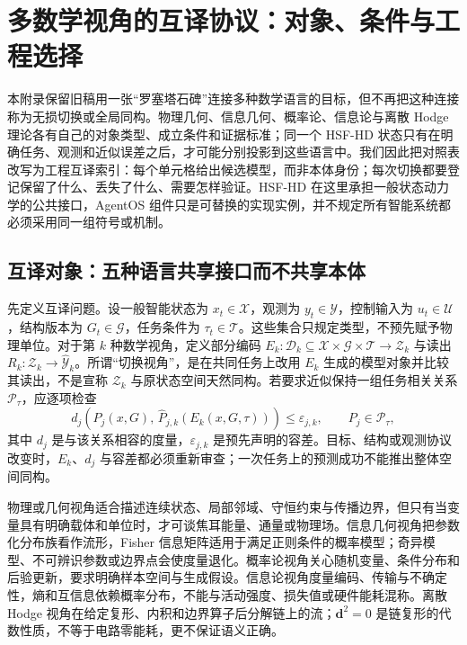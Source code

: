 \chapter{多数学视角的互译协议：对象、条件与工程选择}
\label{sec:section_7739}

本附录保留旧稿用一张“罗塞塔石碑”连接多种数学语言的目标，但不再把这种连接称为无损切换或全局同构。物理几何、信息几何、概率论、信息论与离散 Hodge 理论各有自己的对象类型、成立条件和证据标准；同一个 HSF-HD 状态只有在明确任务、观测和近似误差之后，才可能分别投影到这些语言中。我们因此把对照表改写为工程互译索引：每个单元格给出候选模型，而非本体身份；每次切换都要登记保留了什么、丢失了什么、需要怎样验证。HSF-HD 在这里承担一般状态动力学的公共接口，AgentOS 组件只是可替换的实现实例，并不规定所有智能系统都必须采用同一组符号或机制。

\section{互译对象：五种语言共享接口而不共享本体}

先定义互译问题。设一般智能状态为 $x_t\in\mathcal X$，观测为 $y_t\in\mathcal Y$，控制输入为 $u_t\in\mathcal U$，结构版本为 $G_t\in\mathcal G$，任务条件为 $\tau_t\in\mathcal T$。这些集合只规定类型，不预先赋予物理单位。对于第 $k$ 种数学视角，定义部分编码 $E_k:\mathcal D_k\subseteq\mathcal X\times\mathcal G\times\mathcal T\rightarrow\mathcal Z_k$ 与读出 $R_k:\mathcal Z_k\rightarrow\widehat{\mathcal Y}_k$。所谓“切换视角”，是在共同任务上改用 $E_k$ 生成的模型对象并比较其读出，不是宣称 $\mathcal Z_k$ 与原状态空间天然同构。若要求近似保持一组任务相关关系 $\mathcal P_\tau$，应逐项检查
\[
 d_j\!\left(P_j(x,G),\,\widehat P_{j,k}(E_k(x,G,\tau))\right)\leq \varepsilon_{j,k},
 \qquad P_j\in\mathcal P_\tau ,
\]
其中 $d_j$ 是与该关系相容的度量，$\varepsilon_{j,k}$ 是预先声明的容差。目标、结构或观测协议改变时，$E_k$、$d_j$ 与容差都必须重新审查；一次任务上的预测成功不能推出整体空间同构。

物理或几何视角适合描述连续状态、局部邻域、守恒约束与传播边界，但只有当变量具有明确载体和单位时，才可谈焦耳能量、通量或物理场。信息几何视角把参数化分布族看作流形，Fisher 信息矩阵适用于满足正则条件的概率模型；奇异模型、不可辨识参数或边界点会使度量退化。概率论视角关心随机变量、条件分布和后验更新，要求明确样本空间与生成假设。信息论视角度量编码、传输与不确定性，熵和互信息依赖概率分布，不能与活动强度、损失值或硬件能耗混称。离散 Hodge 视角在给定复形、内积和边界算子后分解链上的流；$\mathbf d^2=0$ 是链复形的代数性质，不等于电路零能耗，更不保证语义正确。

